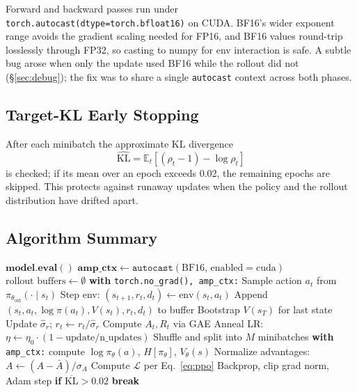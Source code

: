 \documentclass[11pt,a4paper]{article}
\begin{document}
Forward and backward passes run under \texttt{torch.autocast(dtype=torch.bfloat16)}
on CUDA. BF16's wider exponent range avoids the gradient scaling needed for FP16,
and BF16 values round-trip losslessly through FP32, so casting to numpy for env
interaction is safe. A subtle bug arose when only the update used BF16 while the
rollout did not (\S\ref{sec:debug}); the fix was to share a single \texttt{autocast}
context across both phases.

\subsection{Target-KL Early Stopping}

After each minibatch the approximate KL divergence
\[ \widehat{\text{KL}} = \mathbb{E}_t[(\rho_t - 1) - \log \rho_t] \]
is checked; if its mean over an epoch exceeds 0.02, the remaining epochs are
skipped. This protects against runaway updates when the policy and the rollout
distribution have drifted apart.

\subsection{Algorithm Summary}

\begin{algorithm}[h]
\caption{PPO training loop (one update iteration)}
\label{alg:ppo}
\begin{algorithmic}[1]
\State $\textbf{model.eval}()$ 
\State $\textbf{amp\_ctx} \gets \texttt{autocast}(\text{BF16, enabled} = \text{cuda})$
\State $\text{rollout buffers} \gets \emptyset$
\State \textbf{with} \texttt{torch.no\_grad(), amp\_ctx:}
  \State Sample action $a_t$ from $\pi_{\theta_{\text{old}}}(\cdot \mid s_t)$
  \State Step env: $(s_{t+1}, r_t, d_t) \gets \text{env}(s_t, a_t)$
  \State Append $(s_t, a_t, \log \pi(a_t), V(s_t), r_t, d_t)$ to buffer
\EndFor
\State Bootstrap $V(s_T)$ for last state
  \State Update $\widehat{\sigma}_r$; $r_t \gets r_t / \widehat{\sigma}_r$
\EndIf
\State Compute $A_t, R_t$ via GAE
\State Anneal LR: $\eta \gets \eta_0 \cdot (1 - \text{update}/\text{n\_updates})$
  \State Shuffle and split into $M$ minibatches
    \State \textbf{with} \texttt{amp\_ctx:} compute $\log \pi_\theta(a)$, $H[\pi_\theta]$, $V_\theta(s)$
    \State Normalize advantages: $A \gets (A - \bar{A}) / \sigma_A$
    \State Compute $\mathcal{L}$ per Eq.~\eqref{eq:ppo}
    \State Backprop, clip grad norm, Adam step
  \EndFor
  \State \textbf{if} $\overline{\text{KL}} > 0.02$ \textbf{break} 
\EndFor
\end{algorithmic}
\end{algorithm}
\end{document}
